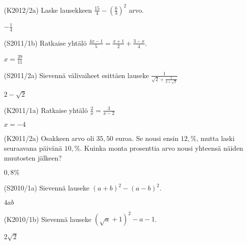 \begin{tehtava}(K2012/2a)  Laske lausekkeen $ \frac{15}{4} - \left( \frac{6}{3} \right)^2 $ arvo.
\begin{vastaus}
				$-\frac{1}{4}$
				\end{vastaus}
\end{tehtava}

\begin{tehtava}(S2011/1b)  Ratkaise yhtälö
                        $ \frac{4x - 1}{5} = \frac{x + 1}{2} + \frac{3 - x}{4}. $
                        \begin{vastaus}
				$x=\frac{29}{11}$
				\end{vastaus}
\end{tehtava}

\begin{tehtava}(S2011/2a)  Sievennä välivaiheet esittäen lauseke
                     $ \frac{1}{\sqrt{2} + \frac{1}{2 + \sqrt{2}}} $
                     \begin{vastaus}
				$2-\sqrt{2}$
				\end{vastaus}
\end{tehtava}


\begin{tehtava}(K2011/1a)  Ratkaise yhtälö
                        $ \frac{2}{x} = \frac{3}{x - 2} $
\begin{vastaus}
				$x=-4$
				\end{vastaus}
\end{tehtava}

\begin{tehtava}(K2011/2a)  Osakkeen arvo oli $35,50$ euroa. Se nousi ensin $12,\%$,
                        mutta laski seuraavana päivänä $10,\%$. Kuinka monta prosenttia
                        arvo nousi yhteensä näiden muutosten jälkeen?
                        \begin{vastaus}
				$0,8\%$
				\end{vastaus}
\end{tehtava}


\begin{tehtava}(S2010/1a)  Sievennä lauseke $ (a + b)^2 - (a - b)^2 $.
\begin{vastaus}
				$4ab$
				\end{vastaus}
\end{tehtava}

\begin{tehtava}(K2010/1b)  Sievennä lauseke $ (\sqrt{a} + 1)^2 - a - 1 $.
\begin{vastaus}
				$2\sqrt{2}$
				\end{vastaus}
\end{tehtava}

